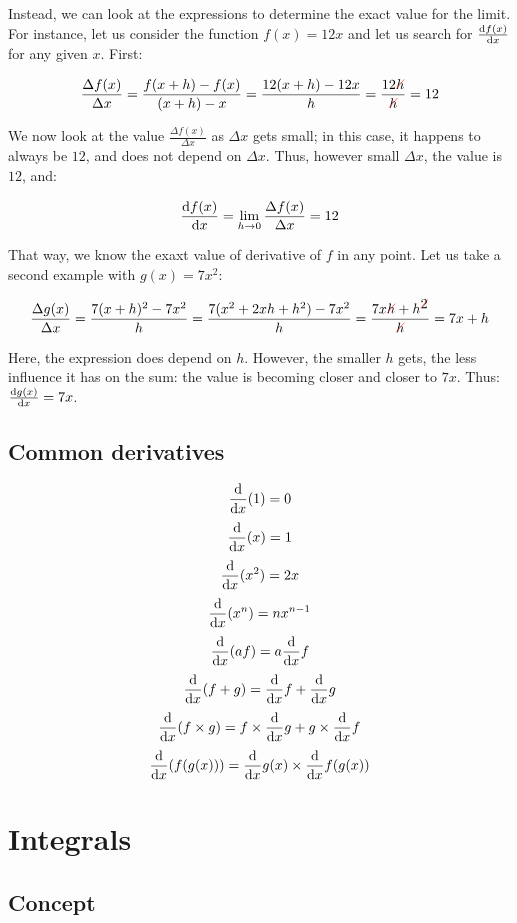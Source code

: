 Instead, we can look at the expressions to determine the exact value
for the limit. For instance, let us consider the function $f(x) = 12x$
and let us search for $\frac {\mathrm{d} f(x)} {\mathrm{d} x}$ for any given $x$. First:

\[
\frac {\Delta f(x)} {\Delta x}
= \frac {f(x+h) - f(x)} {(x+h) - x}
= \frac {12(x+h) - 12x} {h}
= \frac {12\strike[red]{h}} {\strike[red]{h}}
= 12
\]

We now look at the value $\frac {\Delta f(x)} {\Delta x}$ as $\Delta x$
gets small; in this case, it happens to always be $12$, and does not
depend on $\Delta x$. Thus, however small $\Delta x$, the value is
$12$, and:

\[
\frac {\mathrm{d} f(x)} {\mathrm{d} x}
= \lim_{h \to 0} \frac {\Delta f(x)} {\Delta x}
= 12
\]

That way, we know the exaxt value of derivative of $f$ in any point. Let
us take a second example with $g(x) = 7x^2$:

\[
\frac {\Delta g(x)} {\Delta x}
= \frac {7(x+h)^2 - 7x^2} {h}
= \frac {7(x^2 + 2xh + h^2) - 7x^2} {h}
= \frac {7x\strike[red]{h} + h^{\strike[red]{2}}} {\strike[red]{h}}
= 7x + h
\]

Here, the expression does depend on $h$. However, the smaller $h$ gets,
the less influence it has on the sum: the value is becoming closer and
closer to $7x$. Thus: $\frac {\mathrm{d} g(x)} {\mathrm{d} x} = 7x$.


\subsection{Common derivatives}

\[
\frac {\mathrm{d}} {\mathrm{d} x} (1)   = 0
\]
\[
\frac {\mathrm{d}} {\mathrm{d} x} (x)   = 1
\]
\[
\frac {\mathrm{d}} {\mathrm{d} x} (x^2) = 2x
\]
\[
\frac {\mathrm{d}} {\mathrm{d} x} (x^n) = n x^{n-1}
\]
\[
\frac {\mathrm{d}} {\mathrm{d} x} (a f)
= a \frac {\mathrm{d}} {\mathrm{d} x} f
\]
\[
\frac {\mathrm{d}} {\mathrm{d} x} (f + g)
= \frac {\mathrm{d}} {\mathrm{d} x} f
+ \frac {\mathrm{d}} {\mathrm{d} x} g
\]
\[
\frac {\mathrm{d}} {\mathrm{d} x} (f \times g)
= f \times \frac {\mathrm{d}} {\mathrm{d} x} g
+ g \times \frac {\mathrm{d}} {\mathrm{d} x} f
\]
\[
\frac {\mathrm{d}} {\mathrm{d} x} (f(g(x)))
= \frac {\mathrm{d}} {\mathrm{d} x} g(x)
\times \frac {\mathrm{d}} {\mathrm{d} x} f(g(x))
\]



\section{Integrals}


\subsection{Concept}

